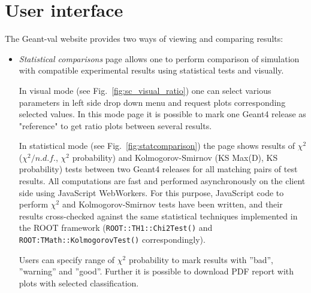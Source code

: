 \section{User interface}
\label{sec-analyse}

The \textsf{Geant-val} website provides two ways of viewing and comparing results:

\begin{itemize}



\item \textit{Statistical comparisons} page allows one to perform comparison of simulation with compatible experimental results using statistical tests and visually. %

In visual mode  (see Fig.~\ref{fig:sc_visual_ratio}) one can select various parameters in left side drop down menu and request plots corresponding selected values. In this mode page it is possible to mark one Geant4 release as "reference" to get ratio plots between several results.

In statistical mode (see Fig.~\ref{fig:statcomparison}) the page shows results of $\chi^2$ ($\chi^2/n.d.f.$, $\chi^2$ probability) and Kolmogorov-Smirnov (KS Max(D), KS probability) tests between two Geant4 releases for all matching pairs of test results.
All computations are fast and performed asynchronously on the client side using JavaScript WebWorkers. For this purpose, JavaScript code to perform $\chi^2$ and Kolmogorov-Smirnov tests have been written, and their results cross-checked against the same statistical techniques implemented in the ROOT framework ({\tt ROOT::TH1::Chi2Test()} and {\tt ROOT:TMath::KolmogorovTest()} correspondingly).

Users can specify range of $\chi^2$ probability to mark results with ''bad'', ''warning'' and ''good''. Further it is possible to download PDF report with plots with selected classification.


\end{itemize}
